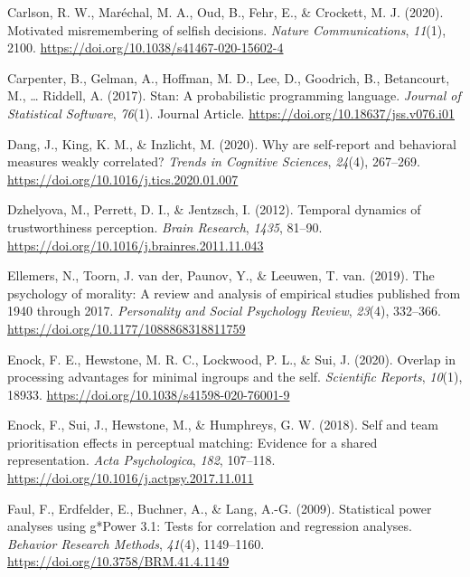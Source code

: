 \documentclass[
  english,
  man]{apa6}
\begin{document}
\leavevmode\hypertarget{ref-carlson_motivated_2020}{}%
Carlson, R. W., Maréchal, M. A., Oud, B., Fehr, E., \& Crockett, M. J. (2020). Motivated misremembering of selfish decisions. \emph{Nature Communications}, \emph{11}(1), 2100. \url{https://doi.org/10.1038/s41467-020-15602-4}

\leavevmode\hypertarget{ref-Carpenter_2017_stan}{}%
Carpenter, B., Gelman, A., Hoffman, M. D., Lee, D., Goodrich, B., Betancourt, M., \ldots{} Riddell, A. (2017). Stan: A probabilistic programming language. \emph{Journal of Statistical Software}, \emph{76}(1). Journal Article. \url{https://doi.org/10.18637/jss.v076.i01}

\leavevmode\hypertarget{ref-dang_why_2020}{}%
Dang, J., King, K. M., \& Inzlicht, M. (2020). Why are self-report and behavioral measures weakly correlated? \emph{Trends in Cognitive Sciences}, \emph{24}(4), 267--269. \url{https://doi.org/10.1016/j.tics.2020.01.007}

\leavevmode\hypertarget{ref-dzhelyova_temporal_2012}{}%
Dzhelyova, M., Perrett, D. I., \& Jentzsch, I. (2012). Temporal dynamics of trustworthiness perception. \emph{Brain Research}, \emph{1435}, 81--90. \url{https://doi.org/10.1016/j.brainres.2011.11.043}

\leavevmode\hypertarget{ref-ellemers_psychology_2019}{}%
Ellemers, N., Toorn, J. van der, Paunov, Y., \& Leeuwen, T. van. (2019). The psychology of morality: A review and analysis of empirical studies published from 1940 through 2017. \emph{Personality and Social Psychology Review}, \emph{23}(4), 332--366. \url{https://doi.org/10.1177/1088868318811759}

\leavevmode\hypertarget{ref-enock_overlap_2020}{}%
Enock, F. E., Hewstone, M. R. C., Lockwood, P. L., \& Sui, J. (2020). Overlap in processing advantages for minimal ingroups and the self. \emph{Scientific Reports}, \emph{10}(1), 18933. \url{https://doi.org/10.1038/s41598-020-76001-9}

\leavevmode\hypertarget{ref-enock_self_2018}{}%
Enock, F., Sui, J., Hewstone, M., \& Humphreys, G. W. (2018). Self and team prioritisation effects in perceptual matching: Evidence for a shared representation. \emph{Acta Psychologica}, \emph{182}, 107--118. \url{https://doi.org/10.1016/j.actpsy.2017.11.011}

\leavevmode\hypertarget{ref-faul_statistical_2009}{}%
Faul, F., Erdfelder, E., Buchner, A., \& Lang, A.-G. (2009). Statistical power analyses using g*Power 3.1: Tests for correlation and regression analyses. \emph{Behavior Research Methods}, \emph{41}(4), 1149--1160. \url{https://doi.org/10.3758/BRM.41.4.1149}
\end{document}
